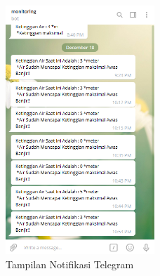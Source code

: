\begin{figure}[H]
        \centering
        \includegraphics[width=0.5\textwidth]{figures/telegram2.png}
        \caption{Tampilan Notifikasi Telegram}
        \label{print}
        \end{figure}